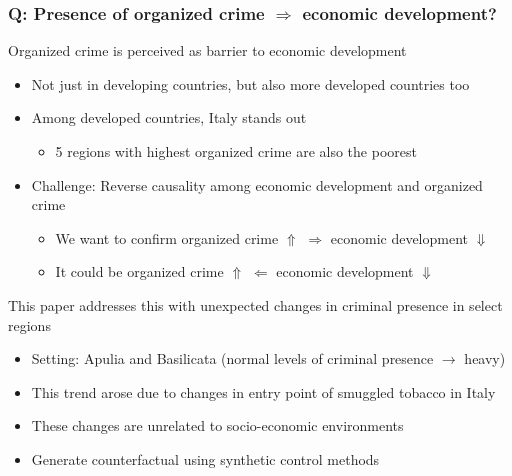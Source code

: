 \documentclass[aspectratio=169]{beamer}
\begin{document}
\begin{frame}
\frametitle{Q: Presence of organized crime $\Rightarrow$ economic development?} 
Organized crime is perceived as barrier to economic development
\begin{itemize}\setlength\itemsep{3pt}
\item Not just in developing countries, but also more developed countries too 
\item Among developed countries, Italy stands out
\begin{itemize}\setlength\itemsep{3pt}
\item 5 regions with highest organized crime are also the poorest
\end{itemize}
\item Challenge: Reverse causality among economic development and organized crime
\begin{itemize}\setlength\itemsep{3pt}
\item We want to confirm organized crime $\Uparrow$ $\Rightarrow$ economic development $\Downarrow$
\item It could be organized crime $\Uparrow$ $\Leftarrow$ economic development $\Downarrow$
\end{itemize}
\end{itemize}\medskip
This paper addresses this with unexpected changes in criminal presence in select regions
\begin{itemize}\setlength\itemsep{3pt}
\item Setting: Apulia and Basilicata (normal levels of criminal presence $\to$ heavy)
\item This trend arose due to changes in entry point of smuggled tobacco in Italy
\item These changes are unrelated to socio-economic environments
\item Generate counterfactual using synthetic control methods
\end{itemize}
\end{frame}
\end{document}
